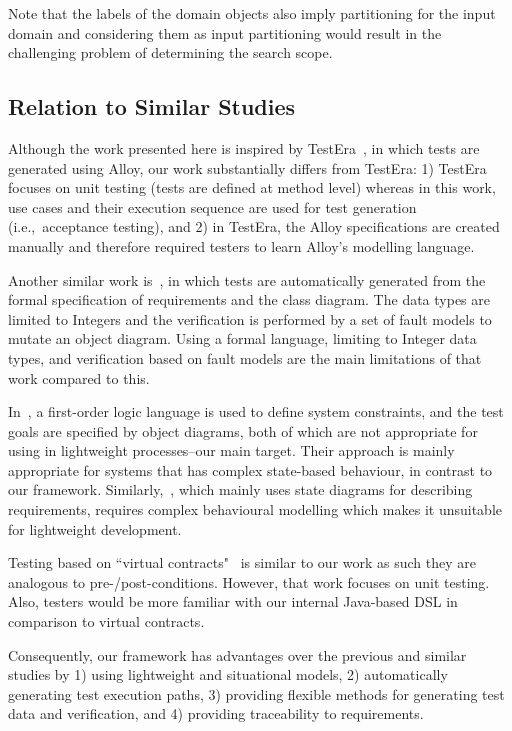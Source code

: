Note that the labels of the domain objects also imply partitioning for the input domain and considering them as input partitioning would result in the challenging problem of determining the search scope.

\subsection{Relation to Similar Studies}
\label{sec:discussion-similar}
Although the work presented here is inspired by TestEra~\cite{Khurshid2004}, in which tests are generated using Alloy, our work substantially differs from TestEra: 1) TestEra focuses on unit testing (tests are defined at method level) whereas in this work, use cases and their execution sequence are used for test generation (i.e.,\ acceptance testing), and 2) in TestEra, the Alloy specifications are created manually and therefore required testers to learn Alloy's modelling language.

Another similar work is~\cite{Kaplan2008}, in which tests are automatically generated from the formal specification of requirements and the class diagram. The data types are limited to Integers and the verification is performed by a set of fault models to mutate an object diagram. Using a formal language, limiting to Integer data types, and verification based on fault models are the main limitations of that work compared to this.

In~\cite{Scheetz1999}, a first-order logic language is used to define system constraints, and the test goals are specified by object diagrams, both of which are not appropriate for using in lightweight processes--our main target. Their approach is mainly appropriate for systems that has complex state-based behaviour, in contrast to our framework.
Similarly,~\cite{Cavarra2002}, which mainly uses state diagrams for describing requirements, requires complex behavioural modelling which makes it unsuitable for lightweight development.

Testing based on ``virtual contracts"~\cite{Engels2006} is similar to our work as such they are analogous to pre-/post-conditions. However, that work focuses on unit testing. Also, testers would be more familiar with our internal Java-based DSL in comparison to virtual contracts.

Consequently, our framework has advantages over the previous and similar studies by 1) using lightweight and situational models, 2) automatically generating test execution paths, 3) providing flexible methods for generating test data and verification, and 4) providing traceability to requirements.

